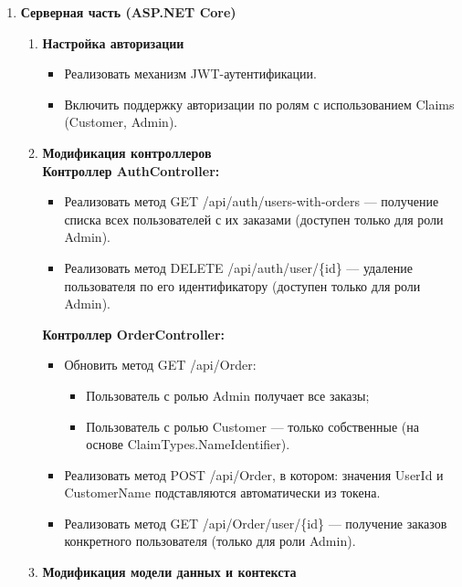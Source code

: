 \documentclass[12pt]{article}
\renewcommand{\texttt}[1]{{\small\ttfamily #1}}
\numberwithin{figure}{section}
\begin{document}
\begin{enumerate}
	\item \textbf{Серверная часть (ASP.NET Core)}
	      \begin{enumerate}
		      \item \textbf{Настройка авторизации}
		            \begin{itemize}
			            \item Реализовать механизм JWT-аутентификации.
			            \item Включить поддержку авторизации по ролям с использованием Claims (\texttt{Customer}, \texttt{Admin}).
		            \end{itemize}
		      \item \textbf{Модификация контроллеров} \\
		            \textbf{Контроллер \texttt{AuthController}:}
		            \begin{itemize}
			            \item Реализовать метод \texttt{GET /api/auth/users-with-orders} — получение списка всех пользователей с их заказами (доступен только для роли \texttt{Admin}).
			            \item Реализовать метод \texttt{DELETE /api/auth/user/\{id\}} — удаление пользователя по его идентификатору (доступен только для роли \texttt{Admin}).
		            \end{itemize}
		            \textbf{Контроллер \texttt{OrderController}:}
		            \begin{itemize}
			            \item Обновить метод \texttt{GET /api/Order}:
			                  \begin{itemize}
				                  \item Пользователь с ролью \texttt{Admin} получает все заказы;
				                  \item Пользователь с ролью \texttt{Customer} — только собственные (на основе \texttt{ClaimTypes.\-NameIdentifier}).
			                  \end{itemize}
			            \item Реализовать метод \texttt{POST /api/Order}, в котором: значения \texttt{UserId} и \texttt{CustomerName} подставляются автоматически из токена.
			            \item Реализовать метод \texttt{GET /api/Order/user/\{id\}} — получение заказов конкретного пользователя (только для роли \texttt{Admin}).
		            \end{itemize}
		      \item \textbf{Модификация модели данных и контекста}

\end{enumerate}
\end{enumerate}
\end{document}
